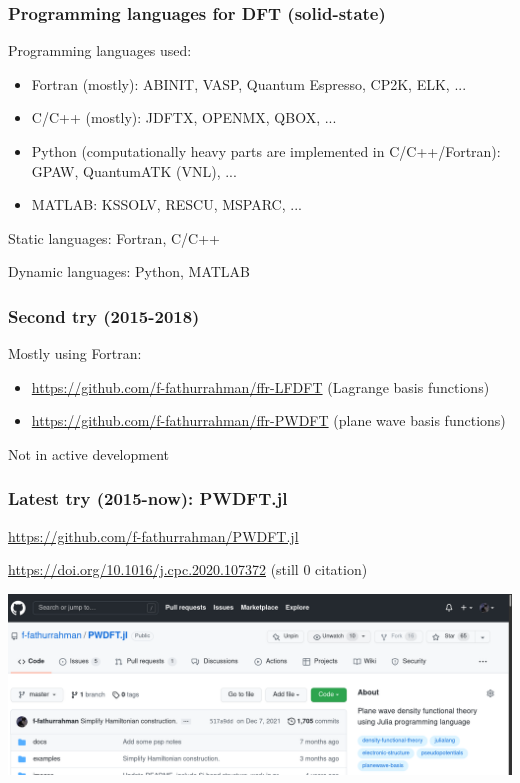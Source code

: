 \begin{frame}
\frametitle{Programming languages for DFT (solid-state)}
    
Programming languages used:
\begin{itemize}
\item Fortran (mostly): ABINIT, VASP, Quantum Espresso, CP2K, ELK, ...
\item C/C++ (mostly): JDFTX, OPENMX, QBOX, ...
\item Python (computationally heavy parts are implemented in C/C++/Fortran): GPAW, QuantumATK (VNL), ...
\item MATLAB: KSSOLV, RESCU, MSPARC, ...
\end{itemize}
    
Static languages: Fortran, C/C++

Dynamic languages: Python, MATLAB

\end{frame}


\begin{frame}
\frametitle{Second try (2015-2018)}

Mostly using Fortran:
\begin{itemize}
\item {\footnotesize\url{https://github.com/f-fathurrahman/ffr-LFDFT}} (Lagrange basis functions)
\item {\footnotesize\url{https://github.com/f-fathurrahman/ffr-PWDFT}} (plane wave basis functions)
\end{itemize}

Not in active development

\end{frame}



\begin{frame}
\frametitle{Latest try (2015-now): PWDFT.jl}

{\footnotesize\url{https://github.com/f-fathurrahman/PWDFT.jl}}

{\footnotesize\url{https://doi.org/10.1016/j.cpc.2020.107372}} (still 0 citation)

{\centering
\includegraphics[width=\textwidth]{images/PWDFT_github.png}
\par}

\end{frame}


